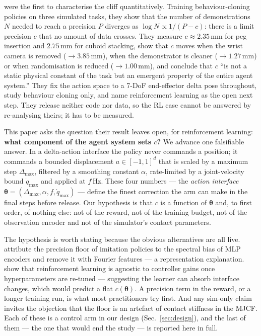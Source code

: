 \documentclass{article}
\newcommand{\dmax}{\Delta_{\max}}
\newcommand{\qdmax}{\dot q_{\max}}
\newcommand{\iface}{\boldsymbol{\theta}}
\begin{document}
\citet{xu2026curse} were the first to characterise the cliff quantitatively.
Training behaviour-cloning policies on three simulated tasks, they show that
the number of demonstrations $N$ needed to reach a precision $P$ diverges as
$\log N \propto 1/(P - c)$: there is a limit precision $c$ that no amount of
data crosses. They measure $c \approx 2.35$\,mm for peg insertion and
$2.75$\,mm for cuboid stacking, show that $c$ moves when the wrist camera is
removed ($\to 3.85$\,mm), when the demonstrator is cleaner ($\to 1.27$\,mm) or
when randomisation is reduced ($\to 1.00$\,mm), and conclude that $c$ ``is not
a static physical constant of the task but an emergent property of the entire
agent system.'' They fix the action space to a 7-DoF end-effector delta pose
throughout, study behaviour cloning only, and name reinforcement learning as
the open next step. They release neither code nor data, so the RL case cannot
be answered by re-analysing theirs; it has to be measured.

This paper asks the question their result leaves open, for reinforcement
learning: \textbf{what component of the agent system sets $c$?} We advance one
falsifiable answer. In a delta-action interface the policy never commands a
position; it commands a bounded displacement $a \in [-1,1]^d$ that is scaled by
a maximum step $\dmax$, filtered by a smoothing constant $\alpha$, rate-limited
by a joint-velocity bound $\qdmax$ and applied at $f$\,Hz. These four numbers
--- the \emph{action interface} $\iface = (\dmax, \alpha, f, \qdmax)$ --- define
the finest correction the arm can make in the final steps before release. Our
hypothesis is that $c$ is a function of $\iface$ and, to first order, of nothing
else: not of the reward, not of the training budget, not of the observation
encoder and not of the simulator's contact parameters.

The hypothesis is worth stating because the obvious alternatives are all live.
\citet{gyenes2026fourier} attribute the precision floor of imitation policies to
the spectral bias of MLP encoders and remove it with Fourier features --- a
representation explanation. \citet{bronars2026tune} show that reinforcement
learning is agnostic to controller gains once hyperparameters are re-tuned ---
suggesting the learner can absorb interface changes, which would predict a flat
$c(\iface)$. A precision term in the reward, or a longer training run, is what
most practitioners try first. And any sim-only claim invites the objection that
the floor is an artefact of contact stiffness in the MJCF. Each of these is a
control arm in our design (Sec.~\ref{sec:design}), and the last of them ---
the one that would end the study --- is reported here in full.
\end{document}
